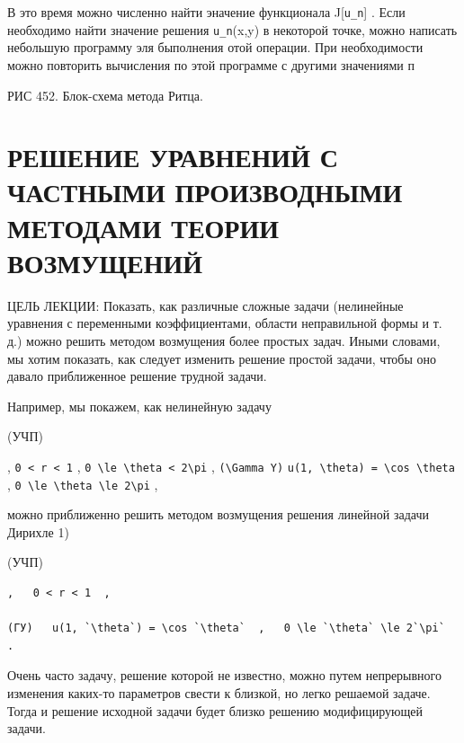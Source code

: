 \documentclass[
  ukrainian,
]{article}
\begin{document}
В это время можно численно найти эначение функционала
J{[}\texttt{u\_n}{]} . Если необходимо найти значение решения
\texttt{u\_n}(x,y) в некоторой точке, можно написать небольшую программу
эля быполнения отой операции. При необходимости можно повторить
вычисления по этой программе с другими значениями п

РИС 452. Блок-схема метода Ритца.

\section{РЕШЕНИЕ УРАВНЕНИЙ С ЧАСТНЫМИ ПРОИЗВОДНЫМИ МЕТОДАМИ ТЕОРИИ
ВОЗМУЩЕНИЙ}\label{ux440ux435ux448ux435ux43dux438ux435-ux443ux440ux430ux432ux43dux435ux43dux438ux439-ux441-ux447ux430ux441ux442ux43dux44bux43cux438-ux43fux440ux43eux438ux437ux432ux43eux434ux43dux44bux43cux438-ux43cux435ux442ux43eux434ux430ux43cux438-ux442ux435ux43eux440ux438ux438-ux432ux43eux437ux43cux443ux449ux435ux43dux438ux439}

ЦЕЛЬ ЛЕКЦИИ: Показать, как различные сложные задачи (нелинейные
уравнения с переменными коэффициентами, области неправильной формы и т.
д.) можно решить методом возмущения более простых задач. Иными словами,
мы хотим показать, как следует изменить решение простой задачи, чтобы
оно давало приближенное решение трудной задачи.

Например, мы покажем, как нелинейную задачу

(УЧП)

, \texttt{0\ \textless{}\ r\ \textless{}\ 1} ,
\texttt{0\ \textbackslash{}le\ \textbackslash{}theta\ \textless{}\ 2\textbackslash{}pi}
, \texttt{(\textbackslash{}Gamma\ Y)}
\texttt{u(1,\ \textbackslash{}theta)\ =\ \textbackslash{}cos\ \textbackslash{}theta}
,
\texttt{0\ \textbackslash{}le\ \textbackslash{}theta\ \textbackslash{}le\ 2\textbackslash{}pi}
,

можно приближенно решить методом возмущения решения линейной задачи
Дирихле 1)

(УЧП)

\begin{verbatim}
,   0 < r < 1  ,

(ГУ)   u(1, `\theta`) = \cos `\theta`  ,   0 \le `\theta` \le 2`\pi`  .
\end{verbatim}

Очень часто задачу, решение которой не известно, можно путем
непрерывного изменения каких-то параметров свести к близкой, но легко
решаемой задаче. Тогда и решение исходной задачи будет близко решению
модифицирующей задачи.
\end{document}
